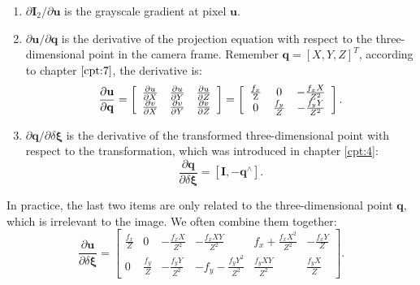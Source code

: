 \begin{enumerate}
	\item $ \partial \mathbf{I}_2 / \partial \mathbf{u} $ is the grayscale gradient at pixel $\mathbf{u}$.
	\item $ \partial \mathbf{u} / \partial \mathbf{q} $ is the derivative of the projection equation with respect to the three-dimensional point in the camera frame. Remember $\mathbf{q}=[X,Y,Z]^T$, according to chapter $\ref{cpt:7}$, the derivative is:
	\begin{equation}
	\frac{{\partial \mathbf{u}}}{{\partial \mathbf{q}}} = \left[ {\begin{array}{*{20}{c}}
		{\frac{{\partial u}}{{\partial X}}}&{\frac{{\partial u}}{{\partial Y}}}&{\frac{{\partial u}}{{\partial Z}}}\\
		{\frac{{\partial v}}{{\partial X}}}&{\frac{{\partial v}}{{\partial Y}}}&{\frac{{\partial v}}{{\partial Z}}}
		\end{array}} \right] = \left[ {\begin{array}{*{20}{c}}
		{\frac{{{f_x}}}{{\rm{Z}}}}&0&{ - \frac{{{f_x}X}}{{{Z^2}}}}\\
		0&{\frac{{{f_y}}}{Z}}&{ - \frac{{{f_y}Y}}{{{Z^2}}}}
		\end{array}} \right].
	\end{equation}
	
	\item ${\partial \mathbf{q}}/{\partial \delta \boldsymbol{\xi} }$ is the derivative of the transformed three-dimensional point with respect to the transformation, which was introduced in chapter \ref{cpt:4}:
	\begin{equation}
	\frac{{\partial \mathbf{q}}}{{\partial \delta \boldsymbol{\xi} }} = \left[ { \mathbf{I}, - {\mathbf{q}^ \wedge }} \right].
	\end{equation}
\end{enumerate}

In practice, the last two items are only related to the three-dimensional point $\mathbf{q}$, which is irrelevant to the image. We often combine them together:
\begin{equation}
\frac{{\partial \mathbf{u}}}{{\partial \delta \boldsymbol{\xi} }} = \left[ {\begin{array}{*{20}{c}}
	{\frac{{{f_x}}}{Z}}&0&{ - \frac{{{f_x}X}}{{{Z^2}}}}&{ - \frac{{{f_x}XY}}{{{Z^2}}}}&{{f_x} + \frac{{{f_x}{X^2}}}{{{Z^2}}}}&{ - \frac{{{f_x}Y}}{Z}}\\
	0&{\frac{{{f_y}}}{Z}}&{ - \frac{{{f_y}Y}}{{{Z^2}}}}&{ - {f_y} - \frac{{{f_y}{Y^2}}}{{{Z^2}}}}&{\frac{{{f_y}XY}}{{{Z^2}}}}&{\frac{{{f_y}X}}{Z}}
	\end{array}} \right].
\end{equation}

